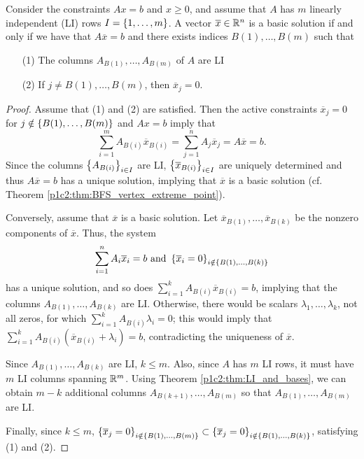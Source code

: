 \begin{theorem} \label{p1c3:thm:LI_and_bases}
	Consider the constraints $Ax = b$ and $x \geq 0$, and assume that $A$ has $m$ linearly independent (LI) rows $I = \left\{ 1,\dots,m \right \}$. A vector $\overline{x} \in \mathbb{R}^n$ is a basic solution if and only if we have that $A \overline{x} = b$ and there exists indices $B(1), \dots, B(m)$ such that
	\begin{enumerate}
		\item[(1)] The columns $A_{B(1)}, \dots, A_{B(m)}$ of $A$ are LI
		\item[(2)] If $j \neq B(1), \dots, B(m)$, then $\overline{x}_j = 0$.
	\end{enumerate} 
\end{theorem}

\begin{proof}
	Assume that (1) and (2) are satisfied. Then the active constraints $\overline{x}_j = 0$ for $j \notin \left\{ B(1), \dots, B(m) \right \}$ and $Ax = b$ imply that
%	
	\begin{equation*}
		\sum_{i=1}^m A_{B(i)}\overline{x}_{B(i)} = \sum_{j=1}^n A_j\overline{x}_j = A\overline{x} = b.
	\end{equation*}
%
	Since the columns $\left\{ A_{B(i)} \right \}_{i \in I}$ are LI, $\left\{ \overline{x}_{B(i)} \right \}_{i \in I}$ are uniquely determined and thus $A\overline{x} = b$ has a unique solution, implying that $\overline{x}$ is a basic solution (cf. Theorem \ref{p1c2:thm:BFS_vertex_extreme_point}).
	
	Conversely, assume that $\overline{x}$ is a basic solution. Let $\overline{x}_{B(1)}, \dots, \overline{x}_{B(k)}$ be the nonzero components of $\overline{x}$. Thus, the system 
%	
		\begin{equation*}
			\sum_{i=1}^n A_i\overline{x}_i = b \text{ and } \left\{ \overline{x}_i = 0 \right \}_{i \notin \left\{ B(1), \dots, B(k) \right \}}
		\end{equation*}
%
	has a unique solution, and so does $\sum_{i=1}^k A_{B(i)}\overline{x}_{B(i)} = b$, implying that the columns $A_{B(1)}, \dots, A_{B(k)}$ are LI. Otherwise, there would be scalars $\lambda_1,\dots, \lambda_k$, not all zeros, for which $\sum_{i=1}^k A_{B(i)}\lambda_i = 0$; this would imply that $\sum_{i=1}^k A_{B(i)}(\overline{x}_{B(i)} + \lambda_i) =b$, contradicting the uniqueness of $\overline{x}$.
	
	Since $A_{B(1)}, \dots, A_{B(k)}$ are LI, $k \leq m$. Also, since $A$ has $m$ LI rows, it must have $m$ LI columns spanning $\mathbb{R}^m$. Using Theorem \ref{p1c2:thm:LI_and_bases}, we can obtain $m-k$ additional columns $A_{B(k+1)}, \dots, A_{B(m)}$ so that $A_{B(1)}, \dots, A_{B(m)}$ are LI. 
	
	Finally, since $k \leq m $, $\left\{ \overline{x}_j = 0 \right \}_{i \notin \left\{ B(1), \dots, B(m) \right \}} \subset  \left\{ \overline{x}_j = 0 \right \}_{i \notin \left\{ B(1), \dots, B(k) \right \}}$, satisfying (1) and (2). \qedhere 		
\end{proof}	

